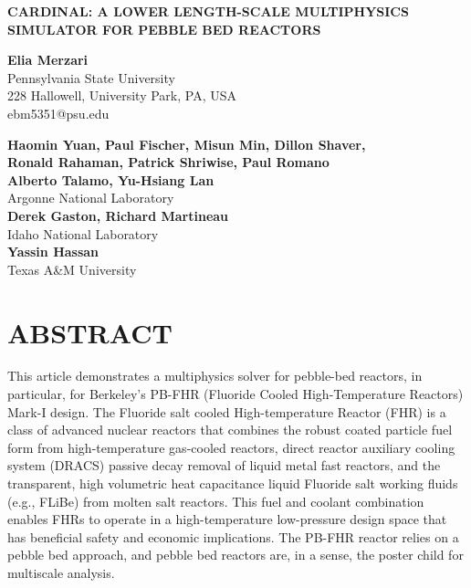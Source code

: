 \documentclass[11pt,letterpaper,english]{article}
\begin{document}
\vspace*{-0.45in}
\begin{center}
{\Large\centering\bf CARDINAL: A LOWER LENGTH-SCALE MULTIPHYSICS SIMULATOR FOR PEBBLE BED REACTORS}

\vspace{3pt}

{\bf \large Elia Merzari} \\
\large Pennsylvania State University \\
\large 228 Hallowell, University Park, PA, USA \\
{\color{brown} ebm5351@psu.edu} \\

\vspace{0.25in}

{\bf \large Haomin Yuan, Paul Fischer, Misun Min, Dillon Shaver,} \\
{\bf \large Ronald Rahaman, Patrick Shriwise, Paul Romano } \\
{\bf \large Alberto Talamo, Yu-Hsiang Lan } \\
\large Argonne National Laboratory \\
\vspace{0.45in}
{\bf \large Derek Gaston, Richard Martineau} \\
\large Idaho National Laboratory \\
\vspace{0.45in}
{\bf \large  Yassin Hassan } \\
\large Texas A\&M University \\


\end{center}



\normalsize

\section*{ABSTRACT}


This article demonstrates a multiphysics solver for pebble-bed reactors, in particular, for Berkeley's PB-FHR (Fluoride Cooled High-Temperature Reactors) Mark-I design. The
Fluoride salt cooled High-temperature Reactor (FHR) is a class of advanced nuclear reactors that combines the
robust coated particle fuel form from high-temperature gas-cooled reactors, direct reactor auxiliary cooling
system (DRACS) passive decay removal of liquid metal fast reactors, and the transparent, high volumetric heat capacitance liquid Fluoride salt working fluids (e.g., FLiBe) from molten salt reactors. This fuel and coolant combination enables FHRs to operate in a high-temperature low-pressure design space that has beneficial safety and economic implications. The PB-FHR reactor relies on a pebble bed approach, and pebble bed reactors are, in a sense, the poster child for multiscale analysis.
\end{document}
